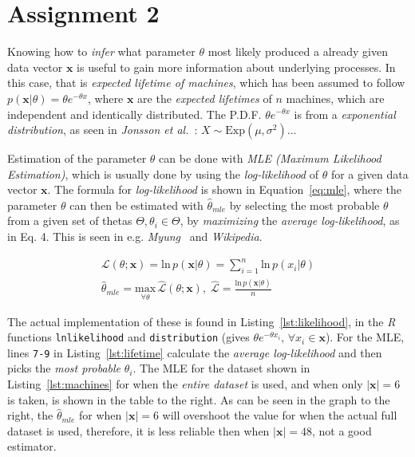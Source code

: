 \documentclass[a4paper, twocolumn]{article}
\begin{document}
    \section*{Assignment 2}

    Knowing how to \emph{infer} what parameter $\theta$ most likely produced a already given data vector $\bm{x}$ is useful to gain more information about underlying processes. In this case, that is \emph{expected lifetime of machines}, which has been assumed to follow $p(\bm{x} | \theta) = \theta e^{-\theta x}$, where $\bm{x}$ are the \emph{expected lifetimes} of $n$ machines, which are independent and identically distributed. The P.D.F. $\theta e^{-\theta x}$ is from a \emph{exponential distribution}, as seen in \emph{Jonsson et al.}~\cite{jonsson1999ett}: $X \sim \mathrm{Exp}(\mu, \sigma^2)$...

    Estimation of the parameter $\theta$ can be done with \emph{MLE (Maximum Likelihood Estimation)}, which is usually done by using the \emph{log-likelihood} of $\theta$ for a given data vector $\bm{x}$. The formula for \emph{log-likelihood} is shown in Equation~\ref{eq:mle}, where the parameter $\theta$ can then be estimated with $\hat{\theta}_{mle}$ by selecting the most probable $\theta$ from a given set of thetas $\Theta, \theta_i \in \Theta$, by \emph{maximizing} the \emph{average log-likelihood}, as in Eq. 4. This is seen in e.g. \emph{Myung}~\cite{myung2003tutorial} and \emph{Wikipedia}.

    \begin{gather} \label{eq:mle}
        \mathcal{L}(\theta ; \bm{x}) = \mathrm{ln}\, p(\bm{x}|\theta) = \sum_{i=1}^{n}\mathrm{ln}\, p(x_i | \theta) \\
        \hat{\theta}_{mle} = \underset{\forall \theta}{\mathrm{max}}\, \mathcal{\hat{L}}(\theta ; \bm{x}),\; \mathcal{\hat{L}} = \frac{\mathrm{ln}\, p(\bm{x}|\theta)}{n}
    \end{gather}

    The actual implementation of these is found in Listing~\ref{lst:likelihood}, in the \emph{R} functions \texttt{lnlikelihood} and \texttt{distribution} (gives $\theta e^{-\theta x_i},\, \forall x_i \in \bm{x}$). For the MLE, lines \texttt{7-9} in Listing~\ref{lst:lifetime} calculate the \emph{average log-likelihood} and then picks the \emph{most probable} $\theta_i$. The MLE for the dataset shown in Listing~\ref{lst:machines} for when the \emph{entire dataset} is used, and when only $|\bm{x}| = 6$ is taken, is shown in the table to the right. As can be seen in the graph to the right, the $\hat{\theta}_{mle}$ for when $|\bm{x}| = 6$ will overshoot the value for when the actual full dataset is used, therefore, it is less reliable then when $|\bm{x}| = 48$, not a good estimator.
\end{document}
